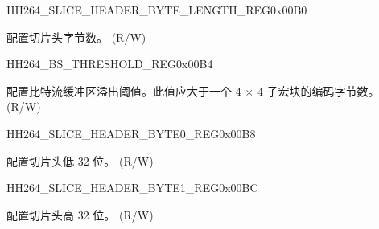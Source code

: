 \begin{register}{H}{H264\_SLICE\_HEADER\_BYTE\_LENGTH\_REG}{0x00B0}\label{regdesc:H264SLICEHEADERBYTELENGTHREG}
%
%
\regnewline%
\begin{regdesc}\begin{reglist}
\label{fielddesc:H264SLICEBYTELENGTH}\item [H264\_SLICE\_BYTE\_LENGTH] 配置切片头字节数。 (R/W)
\end{reglist}\end{regdesc}
\end{register}


\begin{register}{H}{H264\_BS\_THRESHOLD\_REG}{0x00B4}\label{regdesc:H264BSTHRESHOLDREG}
%
%
\regnewline%
\begin{regdesc}\begin{reglist}
\label{fielddesc:H264BSBUFFERTHRESHOLD}\item [H264\_BS\_BUFFER\_THRESHOLD] 配置比特流缓冲区溢出阈值。此值应大于一个 4 × 4 子宏块的编码字节数。 (R/W)
\end{reglist}\end{regdesc}
\end{register}


\begin{register}{H}{H264\_SLICE\_HEADER\_BYTE0\_REG}{0x00B8}\label{regdesc:H264SLICEHEADERBYTE0REG}
%
\regnewline
\begin{regdesc}\begin{reglist}
\label{fielddesc:H264SLICEBYTELSB}\item [H264\_SLICE\_BYTE\_LSB] 配置切片头低 32 位。 (R/W)
\end{reglist}\end{regdesc}
\end{register}


\begin{register}{H}{H264\_SLICE\_HEADER\_BYTE1\_REG}{0x00BC}\label{regdesc:H264SLICEHEADERBYTE1REG}
%
\regnewline%
\begin{regdesc}\begin{reglist}
\label{fielddesc:H264SLICEBYTEMSB}\item [H264\_SLICE\_BYTE\_MSB] 配置切片头高 32 位。 (R/W)
\end{reglist}\end{regdesc}
\end{register}


